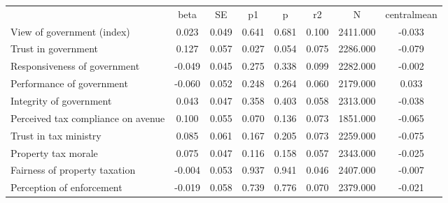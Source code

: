 {\def\sym#1{\ifmmode^{#1}\else\(^{#1}\)\fi} \begin{tabular}{l*{7}{c}} \hline\hline 
& beta & SE & p1 & p & r2 & N & centralmean \\
View of government (index) & 0.023 & 0.049 & 0.641 & 0.681 & 0.100 & 2411.000 & -0.033 \\
Trust in government & 0.127 & 0.057 & 0.027 & 0.054 & 0.075 & 2286.000 & -0.079 \\
Responsiveness of government & -0.049 & 0.045 & 0.275 & 0.338 & 0.099 & 2282.000 & -0.002 \\
Performance of government & -0.060 & 0.052 & 0.248 & 0.264 & 0.060 & 2179.000 & 0.033 \\
Integrity of government & 0.043 & 0.047 & 0.358 & 0.403 & 0.058 & 2313.000 & -0.038 \\
Perceived tax compliance on avenue & 0.100 & 0.055 & 0.070 & 0.136 & 0.073 & 1851.000 & -0.065 \\
Trust in tax ministry & 0.085 & 0.061 & 0.167 & 0.205 & 0.073 & 2259.000 & -0.075 \\
Property tax morale & 0.075 & 0.047 & 0.116 & 0.158 & 0.057 & 2343.000 & -0.025 \\
Fairness of property taxation & -0.004 & 0.053 & 0.937 & 0.941 & 0.046 & 2407.000 & -0.007 \\
Perception of enforcement & -0.019 & 0.058 & 0.739 & 0.776 & 0.070 & 2379.000 & -0.021 \\
\hline\hline \end{tabular} }

